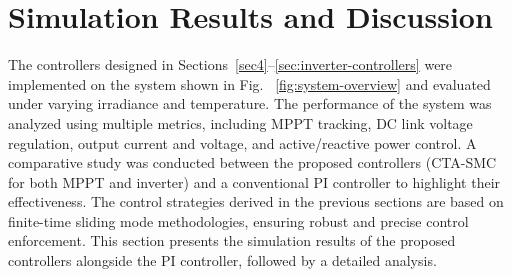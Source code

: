 \documentclass[preprint,12pt]{elsarticle}
\begin{document}
\section{Simulation Results and Discussion}
\label{sec:results}
The controllers designed in Sections~\ref{sec4}--\ref{sec:inverter-controllers} were implemented on the system shown in Fig. ~\ref{fig:system-overview} and evaluated under varying irradiance and temperature. The performance of the system was analyzed using multiple metrics, including MPPT tracking, DC link voltage regulation, output current and voltage, and active/reactive power control. A comparative study was conducted between the proposed controllers (CTA-SMC for both MPPT and inverter) and a conventional PI controller to highlight their effectiveness. The control strategies derived in the previous sections are based on finite-time sliding mode methodologies, ensuring robust and precise control enforcement. This section presents the simulation results of the proposed controllers alongside the PI controller, followed by a detailed analysis.
\end{document}
